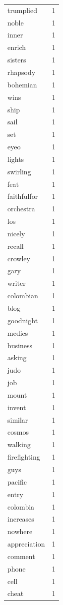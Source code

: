 \begin{tabular}{lr}
trumplied & 1 \\
noble & 1 \\
inner & 1 \\
enrich & 1 \\
sisters & 1 \\
rhapsody & 1 \\
bohemian & 1 \\
wins & 1 \\
ship & 1 \\
sail & 1 \\
set & 1 \\
eyeo & 1 \\
lights & 1 \\
swirling & 1 \\
feat & 1 \\
faithfulfor & 1 \\
orchestra & 1 \\
los & 1 \\
nicely & 1 \\
recall & 1 \\
crowley & 1 \\
gary & 1 \\
writer & 1 \\
colombian & 1 \\
blog & 1 \\
goodnight & 1 \\
medics & 1 \\
business & 1 \\
asking & 1 \\
judo & 1 \\
job & 1 \\
mount & 1 \\
invent & 1 \\
similar & 1 \\
cosmos & 1 \\
walking & 1 \\
firefighting & 1 \\
guys & 1 \\
pacific & 1 \\
entry & 1 \\
colombia & 1 \\
increases & 1 \\
nowhere & 1 \\
appreciation & 1 \\
comment & 1 \\
phone & 1 \\
cell & 1 \\
cheat & 1 \\

\end{tabular}
